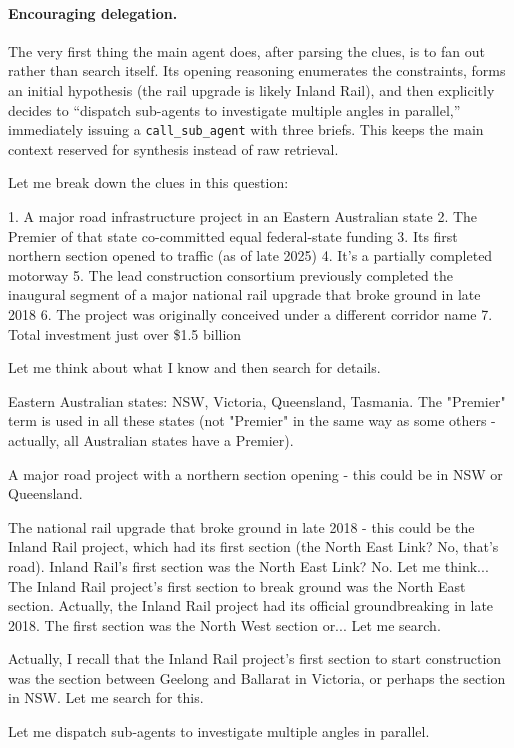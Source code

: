 \documentclass[table]{gtech}
\begin{document}
\paragraph{Encouraging delegation.} The very first thing the main agent does, after parsing the clues, is to fan out rather than search itself. Its opening reasoning enumerates the constraints, forms an initial hypothesis (the rail upgrade is likely Inland Rail), and then explicitly decides to ``dispatch sub-agents to investigate multiple angles in parallel,'' immediately issuing a \texttt{call\_sub\_agent} with three briefs. This keeps the main context reserved for synthesis instead of raw retrieval.

\begin{tcolorbox}[breakable,enhanced jigsaw,colback=yellow!12,colframe=yellow!55,boxrule=0.4pt,left=5pt,right=5pt,top=3pt,bottom=3pt,fonttitle=\bfseries\sffamily\small,coltitle=black,fontupper=\small,title={Main-agent reasoning (first step)}]
Let me break down the clues in this question:

1. A major road infrastructure project in an Eastern Australian state
2. The Premier of that state co-committed equal federal-state funding
3. Its first northern section opened to traffic (as of late 2025)
4. It's a partially completed motorway
5. The lead construction consortium previously completed the inaugural segment of a major national rail upgrade that broke ground in late 2018
6. The project was originally conceived under a different corridor name
7. Total investment just over \$1.5 billion

Let me think about what I know and then search for details.

Eastern Australian states: NSW, Victoria, Queensland, Tasmania. The "Premier" term is used in all these states (not "Premier" in the same way as some others - actually, all Australian states have a Premier).

A major road project with a northern section opening - this could be in NSW or Queensland. 

The national rail upgrade that broke ground in late 2018 - this could be the Inland Rail project, which had its first section (the North East Link? No, that's road). Inland Rail's first section was the North East Link? No. Let me think... The Inland Rail project's first section to break ground was the North East section. Actually, the Inland Rail project had its official groundbreaking in late 2018. The first section was the North West section or... Let me search.

Actually, I recall that the Inland Rail project's first section to start construction was the section between Geelong and Ballarat in Victoria, or perhaps the section in NSW. Let me search for this.

Let me dispatch sub-agents to investigate multiple angles in parallel.
\end{tcolorbox}
\end{document}
